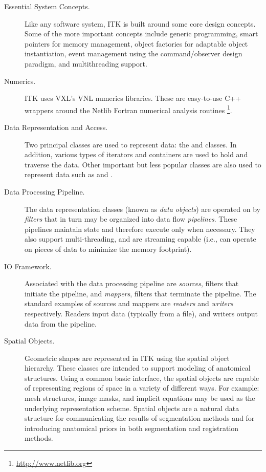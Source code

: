 \begin{description}
	\item[Essential System Concepts.] Like any software system, ITK is
        built around some core design concepts. Some of the more important
        concepts include generic programming, smart pointers for memory
        management, object factories for adaptable object instantiation,
        event management using the command/observer design paradigm, and
        multithreading support.

	\item[Numerics.] ITK uses VXL's VNL numerics libraries. These are
        easy-to-use C++ wrappers around the Netlib Fortran numerical
        analysis routines \footnote{\url{http://www.netlib.org}}.

	\item[Data Representation and Access.]  Two principal classes are
        used to represent data: the  and 
        classes.  In addition, various types of iterators and containers are
        used to hold and traverse the data. Other important but less popular
        classes are also used to represent data such as  and
        .

	\item[Data Processing Pipeline.]  The data representation
	classes (known as \emph{data objects}) are operated on by
	\emph{filters} that in turn may be organized into data flow
	\emph{pipelines}. These pipelines maintain state and therefore
	execute only when necessary.  They also support
	multi-threading, and are streaming capable (i.e., can operate
	on pieces of data to minimize the memory footprint).

        \item[IO Framework.] Associated with the data processing
        pipeline are \emph{sources}, filters that initiate the
        pipeline, and \emph{mappers}, filters that terminate the
        pipeline.  The standard examples of sources and mappers are
        \emph{readers} and \emph{writers} respectively.  Readers
        input data (typically from a file), and writers output data
        from the pipeline.

	\item[Spatial Objects.] Geometric shapes are represented in ITK using
        the spatial object hierarchy.  These classes are intended to support
        modeling of anatomical structures. Using a common basic interface,
        the spatial objects are capable of representing regions of space in a
        variety of different ways. For example: mesh structures, image masks,
        and implicit equations may be used as the underlying representation
        scheme.  Spatial objects are a natural data structure for
        communicating the results of segmentation methods and for introducing
        anatomical priors in both segmentation and registration methods.


\end{description}
